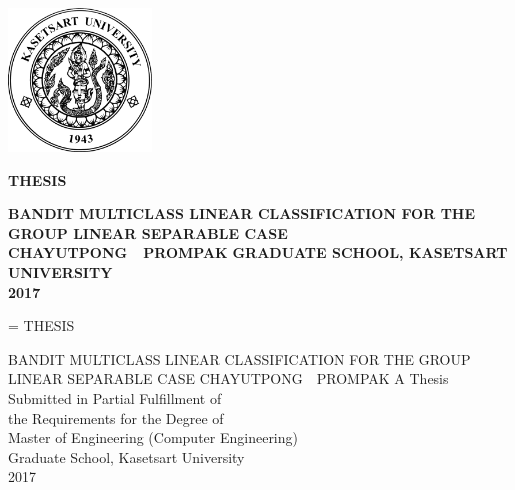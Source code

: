 \thispagestyle{empty}
\setlength{\headsep}{0in}
\begin{titlepage}
\centering
\parskip=0pt
\renewcommand{\baselinestretch}{0}
\fontsize{14pt}{0}
\includegraphics[width=1.5in]{kulogo}
\vspace{0.25in}

{\fontsize{0.25in}{0} \textbf{THESIS} }
\vspace{0.38in}

\textbf{BANDIT MULTICLASS LINEAR CLASSIFICATION FOR THE GROUP LINEAR SEPARABLE CASE}
\vfill
\textbf{CHAYUTPONG\ \ PROMPAK}
\vfill
\textbf{GRADUATE SCHOOL, KASETSART UNIVERSITY\\2017}
\vspace{0.15in}
\end{titlepage}
\setlength{\headsep}{0.4in}

% 

\begin{titlepage}
\centering
\parskip=\baselineskip
\renewcommand{\baselinestretch}{0}
\fontsize{12pt}{0}
{\fontsize{14pt}{0}\selectfont THESIS}


{\fontsize{14pt}{0}\selectfont BANDIT MULTICLASS LINEAR CLASSIFICATION FOR THE GROUP LINEAR SEPARABLE CASE}
\vfill
CHAYUTPONG\ \ PROMPAK
\vfill
A Thesis Submitted in Partial Fulfillment of \\
the Requirements for the Degree of \\
Master of Engineering (Computer Engineering) \\ 
Graduate School, Kasetsart University \\
2017
\end{titlepage}

